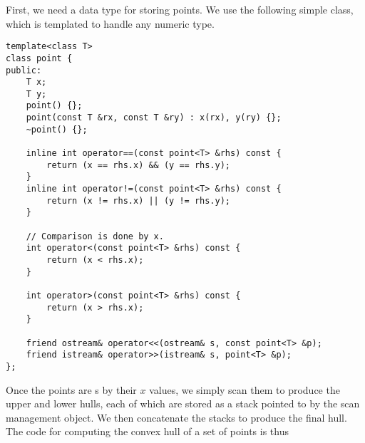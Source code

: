 First, we need a data type for storing points.  We use the following
simple class, which is templated to handle any numeric type.

\begin{verbatim}
template<class T>
class point {
public:
    T x;
    T y;
    point() {};
    point(const T &rx, const T &ry) : x(rx), y(ry) {};
    ~point() {};

    inline int operator==(const point<T> &rhs) const {
        return (x == rhs.x) && (y == rhs.y);
    }
    inline int operator!=(const point<T> &rhs) const {
        return (x != rhs.x) || (y != rhs.y);
    }

    // Comparison is done by x.
    int operator<(const point<T> &rhs) const {
        return (x < rhs.x);
    }

    int operator>(const point<T> &rhs) const {
        return (x > rhs.x);
    }
    
    friend ostream& operator<<(ostream& s, const point<T> &p);
    friend istream& operator>>(istream& s, point<T> &p);
};
\end{verbatim}

Once the points are s by their $x$ values, we simply scan them to
produce the upper and lower hulls, each of which are stored as a stack
pointed to by the scan management object.  We then concatenate the
stacks to produce the final hull.  The code for computing the convex
hull of a set of points is thus

